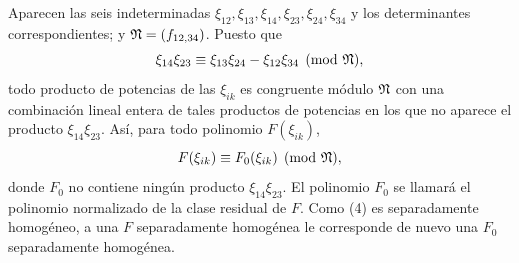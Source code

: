 Aparecen las seis indeterminadas \(\xi_{12},\xi_{13},\xi_{14},\xi_{23},\xi_{24},\xi_{34}\) y los determinantes correspondientes; y \(\mathfrak N=(f_{12,34})\). Puesto que
\begin{equation}
        \xi_{14}\xi_{23}\equiv \xi_{13}\xi_{24}-\xi_{12}\xi_{34}\pmod{\mathfrak N},
\end{equation}
todo producto de potencias de las \(\xi_{ik}\) es congruente módulo \(\mathfrak N\) con una combinación lineal entera de tales productos de potencias en los que no aparece el producto \(\xi_{14}\xi_{23}\). Así, para todo polinomio \(F(\xi_{ik})\),
\begin{equation}
        F(\xi_{ik})\equiv F_0(\xi_{ik})\pmod{\mathfrak N},
\end{equation}
donde \(F_0\) no contiene ningún producto \(\xi_{14}\xi_{23}\). El polinomio \(F_0\) se llamará el polinomio normalizado de la clase residual de \(F\). Como (4) es separadamente homogéneo, a una \(F\) separadamente homogénea le corresponde de nuevo una \(F_0\) separadamente homogénea.

